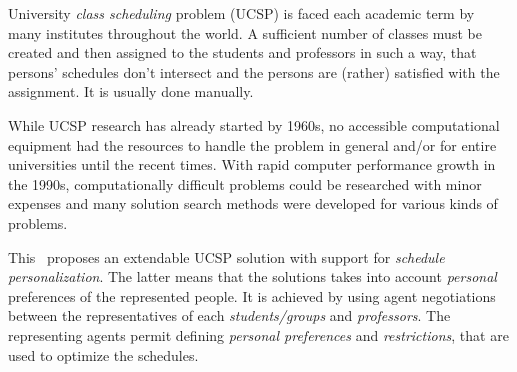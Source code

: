 University \emph{class scheduling} problem (UCSP) is faced each academic term
by many institutes throughout the world. A sufficient number of classes must
be created and then assigned to the students and professors in such a way,
that persons' schedules don't intersect and the persons are (rather) satisfied
with the assignment. It is usually done manually.

While UCSP research has already started by 1960s,
no accessible computational equipment had the resources to handle the problem
in general and/or for entire universities until the recent times.
With rapid computer performance growth in the 1990s, computationally
difficult problems could be researched with minor expenses and many
solution search methods were developed for various kinds of problems.
\medskip

\noindent
This \thisdoc\ proposes an extendable UCSP solution with support for
\emph{schedule personalization}. The latter means that the solutions takes
into account \emph{personal} preferences of the represented people.
It is achieved by using agent negotiations between the representatives of each
\emph{students/groups} and \emph{professors}. The representing agents permit defining
\emph{personal preferences} and \emph{restrictions}, that are used to optimize
the schedules.
